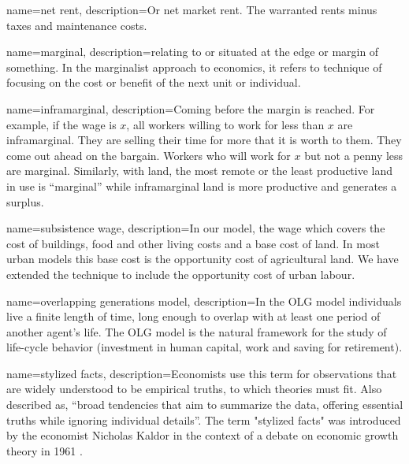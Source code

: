 {
name=net rent,
description={Or net market rent. The warranted rents minus taxes and maintenance costs.}
}



{
name=marginal,
description={relating to or situated at the edge or margin of something. In the marginalist approach to economics, it  refers to technique of focusing on the cost or benefit of the next unit or individual.}
}

{
name=inframarginal,
description={Coming before the margin is reached. For example, if the wage is $x$, all workers willing to work for less than $x$ are inframarginal. They are selling their time for more that it is worth to them. They come out ahead on the bargain. Workers who will work for $x$ but not a penny less are marginal. Similarly, with land, the most remote or the least productive land in use is ``marginal'' while  inframarginal land is more productive and generates a \gls{surplus}.}
}

{
name=subsistence wage,
description={In our model, the wage which covers the cost of buildings, food and other living costs and a base cost of land. In most urban models this base cost is  the opportunity cost of agricultural land. We have extended the technique to include the opportunity cost of urban labour. }
}

{
name=overlapping generations model,
description={In the \gls{OLG} model individuals live a finite length of time, long enough to overlap with at least one period of another agent's life. The OLG model is the natural framework for the study of life-cycle behavior (investment in human capital, work and saving for retirement).}
}

{
name=stylized facts,
description={Economists use this term for observations that are widely understood to be empirical truths, to which theories must fit.  Also described as, ``broad tendencies that aim to summarize the data, offering essential truths while ignoring individual details''. The term "stylized facts" was introduced by the economist Nicholas Kaldor in the context of a debate on economic growth theory in 1961 \cite{kaldorCapitalAccumulationEconomic1961}.}
}

